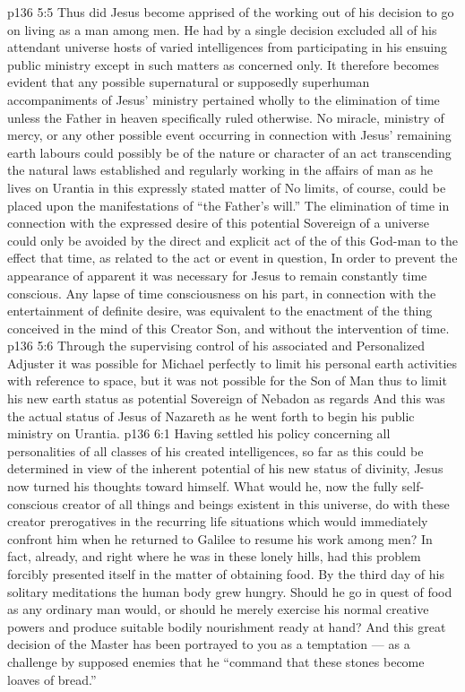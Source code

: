 \vs p136 5:5 \pc Thus did Jesus become apprised of the working out of his decision to go on living as a man among men. He had by a single decision excluded all of his attendant universe hosts of varied intelligences from participating in his ensuing public ministry except in such matters as concerned  only. It therefore becomes evident that any possible supernatural or supposedly superhuman accompaniments of Jesus’ ministry pertained wholly to the elimination of time unless the Father in heaven specifically ruled otherwise. No miracle, ministry of mercy, or any other possible event occurring in connection with Jesus’ remaining earth labours could possibly be of the nature or character of an act transcending the natural laws established and regularly working in the affairs of man as he lives on Urantia  in this expressly stated matter of  No limits, of course, could be placed upon the manifestations of “the Father’s will.” The elimination of time in connection with the expressed desire of this potential Sovereign of a universe could only be avoided by the direct and explicit act of the  of this God\hyp{}man to the effect that time, as related to the act or event in question,  In order to prevent the appearance of apparent  it was necessary for Jesus to remain constantly time conscious. Any lapse of time consciousness on his part, in connection with the entertainment of definite desire, was equivalent to the enactment of the thing conceived in the mind of this Creator Son, and without the intervention of time.
\vs p136 5:6 Through the supervising control of his associated and Personalized Adjuster it was possible for Michael perfectly to limit his personal earth activities with reference to space, but it was not possible for the Son of Man thus to limit his new earth status as potential Sovereign of Nebadon as regards  And this was the actual status of Jesus of Nazareth as he went forth to begin his public ministry on Urantia.
\vs p136 6:1 Having settled his policy concerning all personalities of all classes of his created intelligences, so far as this could be determined in view of the inherent potential of his new status of divinity, Jesus now turned his thoughts toward himself. What would he, now the fully self\hyp{}conscious creator of all things and beings existent in this universe, do with these creator prerogatives in the recurring life situations which would immediately confront him when he returned to Galilee to resume his work among men? In fact, already, and right where he was in these lonely hills, had this problem forcibly presented itself in the matter of obtaining food. By the third day of his solitary meditations the human body grew hungry. Should he go in quest of food as any ordinary man would, or should he merely exercise his normal creative powers and produce suitable bodily nourishment ready at hand? And this great decision of the Master has been portrayed to you as a temptation --- as a challenge by supposed enemies that he “command that these stones become loaves of bread.”
